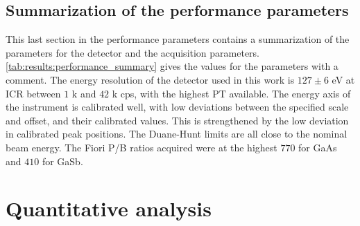 









\clearpage


\subsection{Summarization of the performance parameters}
\label{results:summarization_of_the_performance_parameters}


This last section in the performance parameters contains a summarization of the parameters for the detector and the acquisition parameters.
\cref{tab:results:performance_summary} gives the values for the parameters with a comment.
The energy resolution of the detector used in this work is $127 \pm6$ eV at ICR between $1$ k and $42$ k cps, with the highest PT available.
The energy axis of the instrument is calibrated well, with low deviations between the specified scale and offset, and their calibrated values.
This is strengthened by the low deviation in calibrated peak positions.
The Duane-Hunt limits are all close to the nominal beam energy.
The Fiori P/B ratios acquired were at the highest $770$ for GaAs and $410$ for GaSb.




\clearpage

















\section{Quantitative analysis}
\label{results:quantitative}

